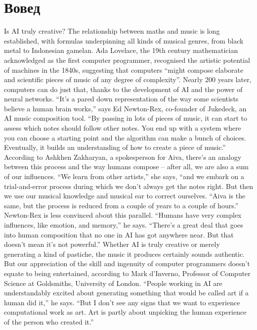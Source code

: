\chapter{Вовед}

Is AI truly creative?
The relationship between maths and music is long established, with formulas underpinning all kinds of musical genres, from black metal to Indonesian gamelan. Ada Lovelace, the 19th century mathematician acknowledged as the first computer programmer, recognised the artistic potential of machines in the 1840s, suggesting that computers “might compose elaborate and scientific pieces of music of any degree of complexity”.
Nearly 200 years later, computers can do just that, thanks to the development of AI and the power of neural networks. “It’s a pared down representation of the way some scientists believe a human brain works,” says Ed Newton-Rex, co-founder of Jukedeck, an AI music composition tool. “By passing in lots of pieces of music, it can start to assess which notes should follow other notes. You end up with a system where you can choose a starting point and the algorithm can make a bunch of choices. Eventually, it builds an understanding of how to create a piece of music.”
According to Ashkhen Zakharyan, a spokesperson for Aiva, there’s an analogy between this process and the way humans compose – after all, we are also a sum of our influences.
“We learn from other artists,” she says, “and we embark on a trial-and-error process during which we don’t always get the notes right. But then we use our musical knowledge and musical ear to correct ourselves.
“Aiva is the same, but the process is reduced from a couple of years to a couple of hours.”
Newton-Rex is less convinced about this parallel. “Humans have very complex influences, like emotion, and memory,” he says.
“There’s a great deal that goes into human composition that no one in AI has got anywhere near. But that doesn’t mean it’s not powerful.”
Whether AI is truly creative or merely generating a kind of pastiche, the music it produces certainly sounds authentic. But our appreciation of the skill and ingenuity of computer programmers doesn’t equate to being entertained, according to Mark d’Inverno, Professor of Computer Science at Goldsmiths, University of London.
“People working in AI are understandably excited about generating something that would be called art if a human did it,” he says. “But I don’t see any signs that we want to experience computational work as art. Art is partly about unpicking the human experience of the person who created it.”

